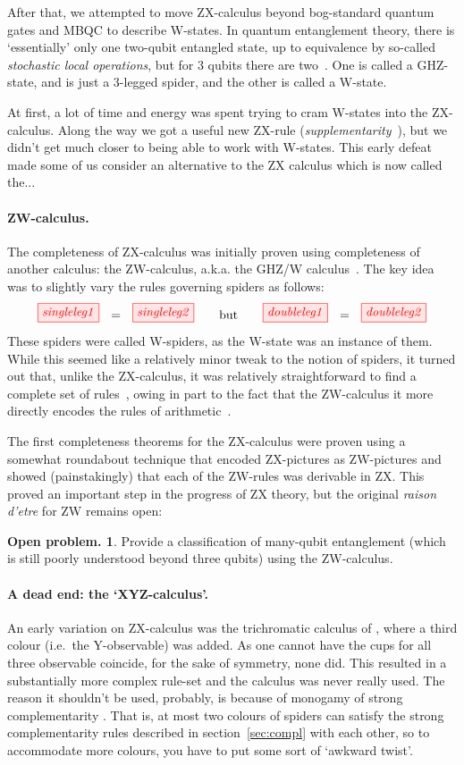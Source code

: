 \documentclass[11pt]{article}
\theoremstyle{definition}
\newtheorem{open}[theorem]{Open problem.}
\begin{document}
{After that, we attempted to move ZX-calculus beyond bog-standard quantum gates and MBQC to describe W-states. In quantum entanglement theory, there is `essentially' only one two-qubit entangled state, up to equivalence by so-called \textit{stochastic local operations}, but for 3 qubits there are two~\cite{DurVC}. One is called a GHZ-state, and is just a 3-legged spider, and the other is called a W-state.

At first, a lot of time and energy was spent trying to cram W-states into the ZX-calculus. Along the way we got a useful new ZX-rule (\textit{supplementarity}~\cite{CEGHZW}), but we didn't get much closer to being able to work with W-states.
This early defeat made some of us consider an alternative to the ZX calculus which is now called the...
  
\paragraph{ZW-calculus.} The completeness of ZX-calculus was initially proven using completeness of another calculus: the ZW-calculus, a.k.a. the GHZ/W calculus~\cite{CK}.  The key idea was to slightly vary the rules governing spiders
as follows:
\[
\tikzfig{singleleg1}\ \ =\ \ \tikzfig{singleleg2} 
\qquad\mbox{but}\qquad
\tikzfig{doubleleg1}\ \ =\ \ \tikzfig{doubleleg2}
\]
These spiders were called W-spiders, as the W-state was an instance of them.  While this seemed like a relatively minor tweak to the notion of spiders, it turned out that, unlike the ZX-calculus, it was relatively straightforward to find a complete set of rules~\cite{Amar}, owing in part to the fact that the ZW-calculus it more directly encodes the rules of arithmetic~\cite{CKMR}.

The first completeness theorems for the ZX-calculus were proven using a somewhat roundabout technique that encoded ZX-pictures as ZW-pictures and showed (painstakingly) that each of the ZW-rules was derivable in ZX. This proved an important step in the progress of ZX theory, but the original \textit{raison d'etre} for ZW remains open:

\begin{open}
  Provide a classification of many-qubit entanglement (which is still poorly understood beyond three qubits) using the ZW-calculus.
\end{open} 

\paragraph{A dead end: the `XYZ-calculus'.}  An early variation on ZX-calculus was the trichromatic calculus of \cite{LangC2}, where a third colour (i.e.~the Y-observable) was added.  As one cannot have the cups for all three observable coincide, for the sake of symmetry, none did. This resulted in a substantially more complex rule-set and the calculus was never really used.  The reason it shouldn't be used, probably, is because of monogamy of strong complementarity \cite{CKbook}. That is, at most two colours of spiders can satisfy the strong complementarity rules described in section~\ref{sec:compl} with each other, so to accommodate more colours, you have to put some sort of `awkward twist'.

}
\end{document}
